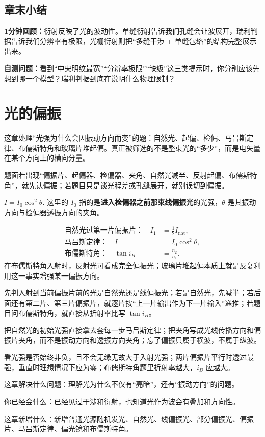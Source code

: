 \documentclass[lang=cn,11pt]{elegantbook}
\newcommand{\chapterroadmap}[3]{%
\begin{introduction}
 \item {\heiti 这章解决什么问题：}#1
 \item {\heiti 你已经会什么：}#2
 \item {\heiti 这章新增什么：}#3
\end{introduction}}
\newcommand{\summaryline}[1]{\par\noindent\textbf{1分钟回顾：}#1\par}
\newcommand{\chapterselfcheck}[1]{\par\noindent\textbf{自测问题：}#1\par}
\begin{document}
\section{章末小结}

\summaryline{衍射反映了光的波动性。单缝衍射告诉我们孔缝会让波展开，瑞利判据告诉我们分辨率有极限，光栅衍射则把“多缝干涉 + 单缝包络”的结构完整展示出来。}
\chapterselfcheck{看到“中央明纹最宽”“分辨率极限”“缺级”这三类提示时，你分别应该先想到哪一个模型？瑞利判据到底在说明什么物理限制？}

\chapter{光的偏振}

\begin{skill}[第9章冲刺总手册]\label{sk:phys-ch09-overview}
 这章处理“光强为什么会因振动方向而变”的题：自然光、起偏、检偏、马吕斯定律、布儒斯特角和玻璃片堆起偏。真正被筛选的不是整束光的“多少”，而是电矢量在某个方向上的横向分量。

 题面若出现“偏振片、起偏器、检偏器、夹角、自然光减半、反射起偏、布儒斯特角”，就先认偏振；若题目只是谈光程差或孔缝展开，就别误切到偏振。


 \(I=I_0\cos^2\theta.\) 
这里的 \(I_0\) 指的是\textbf{进入检偏器之前那束线偏振光}的光强，\(\theta\) 是其振动方向与检偏器透振方向的夹角。


\[
\begin{aligned}
\text{自然光过第一片偏振片：}\quad
I_1&=\frac12 I_{\text{nat}},\\
\text{马吕斯定律：}\quad
I&=I_0\cos^2\theta,\\
\text{布儒斯特角：}\quad
\tan i_B&=\frac{n_2}{n_1}.
\end{aligned}
\]
在布儒斯特角入射时，反射光可看成完全偏振光；玻璃片堆起偏本质上就是反复利用这一事实增强某一偏振方向。

 先判入射到当前偏振片前的光是自然光还是线偏振光；若是自然光，先减半；若后面还有第二片、第三片偏振片，就逐片按“上一片输出作为下一片输入”递推；若题目问布儒斯特角，就直接从折射率比写 \(\tan i_B\)。

 把自然光的初始光强直接拿去套每一步马吕斯定律；把夹角写成光线传播方向和偏振片夹角，而不是振动方向和透振方向夹角；忘了偏振只属于横波，不属于纵波。

 看光强是否始终非负，且不会无缘无故大于入射光强；两片偏振片平行时透过最强，垂直时理想情况下应为零；布儒斯特角题里折射率越大，\(i_B\) 应越大。
\end{skill}

\chapterroadmap
{理解光为什么不仅有“亮暗”，还有“振动方向”的问题。}
{已经见过干涉和衍射，也知道光作为波会有叠加和方向性。}
{新增普通光源随机发光、自然光、线偏振光、部分偏振光、偏振片、马吕斯定律、偏光镜和布儒斯特角。}
\end{document}
